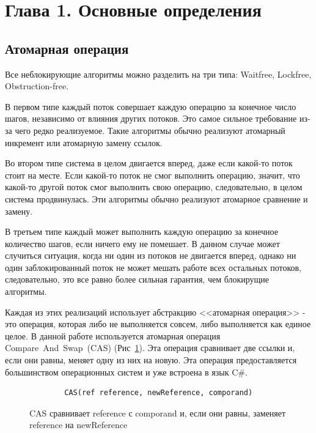 \documentclass[12pt]{article}
\begin{document}
{		\newpage
		
		\section{Глава 1. Основные определения}
			\subsection{Атомарная операция}
				\par Все неблокирующие алгоритмы можно разделить на три типа: Waitfree, Lockfree, Obstruction-free\cite{WaitFree}.
				\par В первом типе каждый поток совершает каждую операцию за конечное число шагов, независимо от влияния других потоков. Это самое сильное требование из-за чего редко реализуемое. Такие алгоритмы обычно реализуют атомарный инкремент или атомарную замену ссылок.
				\par Во втором типе система в целом двигается вперед, даже если какой-то поток стоит на месте. Если какой-то поток не смог выполнить операцию, значит, что какой-то другой поток смог выполнить свою операцию, следовательно, в целом система продвинулась. Эти алгоритмы обычно реализуют атомарное сравнение и замену.
				\par В третьем типе каждый может выполнить каждую операцию за конечное количество шагов, если ничего ему не помешает. В данном случае может случиться ситуация, когда ни один из потоков не двигается вперед, однако ни один заблокированный поток не может мешать работе всех остальных потоков, следовательно, это все равно более сильная гарантия, чем блокирущие алгоритмы.
				\par Каждая из этих реализаций использует абстракцию <<атомарная операция>> - это операция, которая либо не выполняется совсем, либо выполняется как единое целое. В данной работе используется атомарная операция Compare~And~Swap~(CAS) (Рис~\ref{pic:CAS}). Эта операция сравнивает две ссылки и, если они равны, меняет одну из них на новую. Эта операция предоставляется большинством операционных систем и уже встроена в язык C\#.
				\begin{figure}[h]
					\begin{lstlisting}
		CAS(ref reference, newReference, comporand)
					\end{lstlisting}
					\caption{CAS сравнивает reference с comporand и, если они равны, заменяет reference на newReference}
					\label{pic:CAS}
				\end{figure}
}
\end{document}

